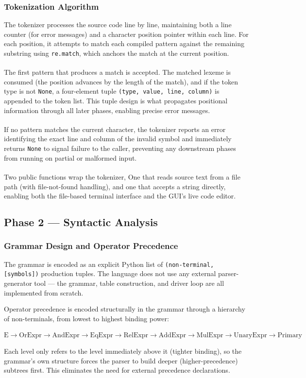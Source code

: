 \documentclass[letterpaper,12pt,oneside]{article}
\begin{document}
\subsubsection{Tokenization Algorithm}
The tokenizer processes the source code line by line, maintaining both a line counter (for error messages) and a character position pointer within each line. For each position, it attempts to match each compiled pattern against the remaining substring using \texttt{re.match}, which anchors the match at the current position.
\\ \\
The first pattern that produces a match is accepted. The matched lexeme is consumed (the position advances by the length of the match), and if the token type is not \texttt{None}, a four-element tuple \texttt{(type, value, line, column)} is appended to the token list. This tuple design is what propagates positional information through all later phases, enabling precise error messages.
\\ \\
If no pattern matches the current character, the tokenizer reports an error identifying the exact line and column of the invalid symbol and immediately returns \texttt{None} to signal failure to the caller, preventing any downstream phases from running on partial or malformed input.
\\ \\
Two public functions wrap the tokenizer, One that reads source text from a file path (with file-not-found handling), and one that accepts a string directly, enabling both the file-based terminal interface and the GUI's live code editor.

\subsection{Phase 2 --- Syntactic Analysis}

\subsubsection{Grammar Design and Operator Precedence}
The grammar is encoded as an explicit Python list of \texttt{(non-terminal, [symbols])} production tuples. The language does not use any external parser-generator tool --- the grammar, table construction, and driver loop are all implemented from scratch.

Operator precedence is encoded structurally in the grammar through a hierarchy of non-terminals, from lowest to highest binding power:
\begin{center}
    $\text{E} \rightarrow \text{OrExpr} \rightarrow \text{AndExpr} \rightarrow \text{EqExpr} \rightarrow \text{RelExpr} \rightarrow \text{AddExpr} \rightarrow \text{MulExpr} \rightarrow \text{UnaryExpr} \rightarrow \text{Primary}$
\end{center}
Each level only refers to the level immediately above it (tighter binding), so the grammar's own structure forces the parser to build deeper (higher-precedence) subtrees first. This eliminates the need for external precedence declarations.
\end{document}
